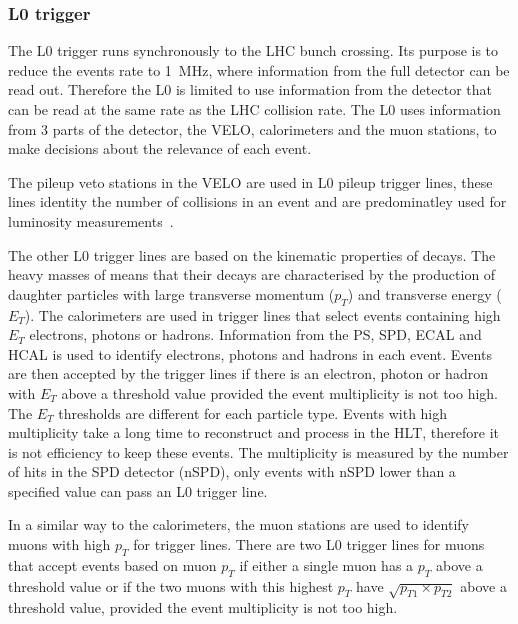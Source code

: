 \subsubsection{L0 trigger}
\label{L0}


The L0 trigger runs synchronously to the LHC bunch crossing. Its purpose is to reduce the events rate to 1~MHz, where information from the full detector can be read out. Therefore the L0 is limited to use information from the detector that can be read at the same rate as the LHC collision rate.
The L0 uses information from 3 parts of the detector, the VELO, calorimeters and the muon stations, to make decisions about the relevance of each event.%


The pileup veto stations in the VELO are used in L0 pileup trigger lines, these lines identity the number of collisions in an event and are predominatley used for luminosity measurements~\cite{Aaij:2011er}.

The other L0 trigger lines are based on the kinematic properties of \bhadron decays. The heavy masses of \bhadrons means that their decays are characterised by the production of daughter particles with large transverse momentum ($p_{T}$) and transverse energy ($E_{T}$).
The calorimeters are used in trigger lines that select events containing high $E_{T}$ electrons, photons or hadrons. Information from the PS, SPD, ECAL and HCAL is used to identify electrons, photons and hadrons in each event. Events are then accepted by the trigger lines if there is an electron, photon or hadron with $E_{T}$ above a threshold value provided the event multiplicity is not too high. The $E_{T}$ thresholds are different for each particle type. Events with high multiplicity take a long time to reconstruct and process in the HLT, therefore it is not efficiency to keep these events. The multiplicity is measured by the number of hits in the SPD detector (nSPD), only events with nSPD lower than a specified value can pass an L0 trigger line. 


In a similar way to the calorimeters, the muon stations are used to identify muons with high $p_{T}$ for trigger lines. There are two L0 trigger lines for muons that accept events based on muon $p_{T}$ if either a single muon has a $p_{T}$ above a threshold value or if the two muons with this highest $p_{T}$ have $\sqrt{p_{T1} \times p_{T2}}$ above a threshold value, provided the event multiplicity is not too high. %

